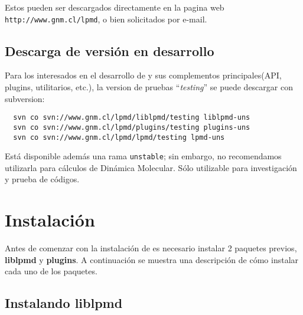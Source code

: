 Estos pueden ser descargados directamente en la pagina web \texttt{http://www.gnm.cl/lpmd}, o bien solicitados por e-mail.

\subsection{Descarga de versi\'on en desarrollo}

Para los interesados en el desarrollo de {\lpmd} y sus complementos principales(API, plugins, utilitarios, etc.), la version de pruebas ``\textit{testing}'' se puede descargar con subversion:

\begin{center}
 \begin{verbatim}
  svn co svn://www.gnm.cl/lpmd/liblpmd/testing liblpmd-uns
  svn co svn://www.gnm.cl/lpmd/plugins/testing plugins-uns
  svn co svn://www.gnm.cl/lpmd/lpmd/testing lpmd-uns
 \end{verbatim}
\end{center}

Est\'a disponible adem\'as una rama \verb|unstable|; sin embargo, no recomendamos utilizarla para c\'alculos de Din\'amica Molecular. S\'olo utilizable para investigaci\'on y prueba de c\'odigos.

\section{Instalaci\'on}
Antes de comenzar con la instalaci\'on de {\lpmd} es necesario instalar 2 paquetes previos, \textbf{liblpmd} y \textbf{plugins}. A continuaci\'on se muestra una descripci\'on de c\'omo instalar cada uno de los paquetes.\\


\subsection{Instalando liblpmd}

